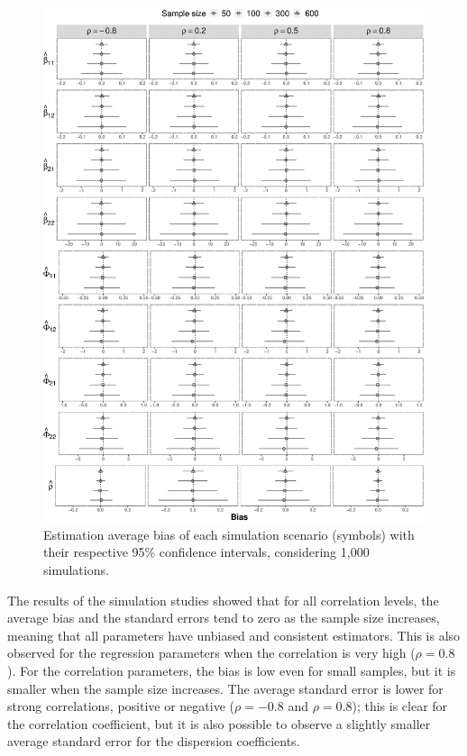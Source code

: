 \documentclass[useAMS,referee]{biom}
\begin{document}
\begin{figure}[htb]
\centering
\includegraphics[width=.98\textwidth]{Figure_2}
\caption{Estimation average bias of each simulation scenario (symbols) with their respective 95\% confidence intervals, considering 1,000 simulations.}
\label{fig1.3}
\end{figure}

The results of the simulation studies showed that for all correlation levels, the average bias and the standard errors tend to zero as the sample size increases, meaning that all parameters have unbiased and consistent estimators. This is also observed for the regression parameters when the correlation is very high ($\rho = 0.8$). For the correlation parameters, the bias is low even for small samples, but it is smaller when the sample size increases. The average standard error is lower for strong correlations, positive or negative ($\rho = -0.8$ and $\rho = 0.8$); this is clear for the correlation coefficient, but it is also possible to observe a slightly smaller average standard error for the dispersion coefficients.
\end{document}
